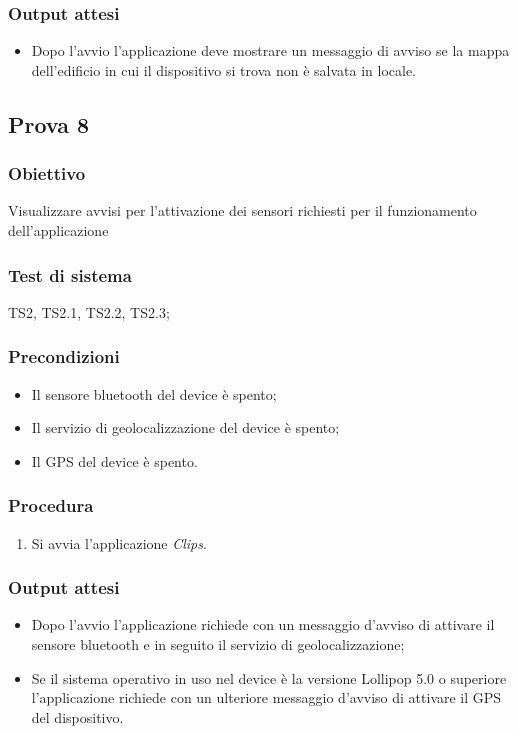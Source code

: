 \documentclass[../Sperimentazione.tex]{subfiles}
\begin{document}
	\subsubsection{Output attesi}
		\begin{itemize}
		\item Dopo l'avvio l'applicazione deve mostrare un messaggio di avviso se la mappa dell'edificio in cui il dispositivo si trova non è salvata in locale.
		\end{itemize}
	
	
	

\newpage	
\subsection{Prova 8} %
\label{subsec:Prova8}
	
	\subsubsection{Obiettivo}
		Visualizzare avvisi per l'attivazione dei sensori richiesti per il funzionamento dell'applicazione
		
	\subsubsection{Test di sistema}
		TS2, TS2.1, TS2.2, TS2.3;
		
	\subsubsection{Precondizioni}
		\begin{itemize}
			\item Il sensore bluetooth del device è spento;
			\item Il servizio di geolocalizzazione del device è spento;
			\item Il GPS del device è spento.
		\end{itemize}
		
	\subsubsection{Procedura}
		\begin{enumerate}
		\item Si avvia l'applicazione \textit{Clips}.
		\end{enumerate}
		
	\subsubsection{Output attesi}
		\begin{itemize}
		\item Dopo l'avvio l'applicazione richiede con un messaggio d'avviso di attivare il sensore bluetooth e in seguito il servizio di geolocalizzazione;
		\item Se il sistema operativo in uso nel device è la versione Lollipop 5.0 o superiore l'applicazione richiede con un ulteriore messaggio d'avviso di attivare il GPS del dispositivo.
		\end{itemize}
		
\end{document}
